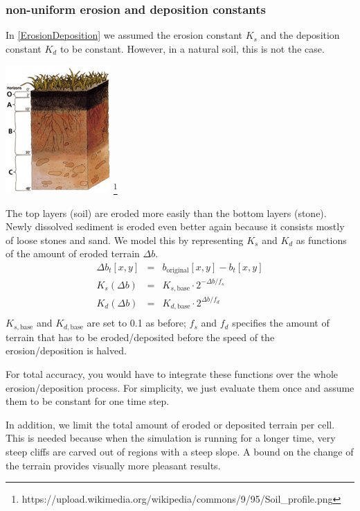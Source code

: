 \documentclass[journal, letterpaper]{IEEEtran}
\begin{document}
\subsubsection{non-uniform erosion and deposition constants}
In \ref{ErosionDeposition} we assumed the erosion constant $K_s$ and the deposition constant $K_d$ to be constant.
However, in a natural soil, this is not the case.
\begin{center}
	\includegraphics[width=0.3\textwidth]{images/Soil_profile}
	\footnote{https://upload.wikimedia.org/wikipedia/commons/9/95/Soil\_profile.png}
\end{center}
The top layers (soil) are eroded more easily than the bottom layers (stone). Newly dissolved sediment is eroded even better again because it consists mostly of loose stones and sand.
We model this by representing $K_s$ and $K_d$ as functions of the amount of eroded terrain $\Delta b$.
\begin{equation}
\begin{array}{rcl}
	\Delta b_t[x,y] &=& b_\text{original}[x,y] - b_t[x,y] \\
	K_s(\Delta b) &=& K_{s,\text{base}} \cdot 2^{-\Delta b / f_s} \\
	K_d(\Delta b) &=& K_{d,\text{base}} \cdot 2^{\Delta b / f_d} \\
\end{array}
\label{eq:KsKd}
\end{equation}
$K_{s,\text{base}}$ and $K_{d,\text{base}}$ are set to 0.1 as before; $f_s$ and $f_d$ specifies the amount of terrain that has to be eroded/deposited before the speed of the erosion/deposition is halved.

For total accuracy, you would have to integrate these functions over the whole erosion/deposition process. For simplicity, we just evaluate them once and assume them to be constant for one time step.

In addition, we limit the total amount of eroded or deposited terrain per cell. This is needed because when the simulation is running for a longer time, very steep cliffs are carved out of regions with a steep slope. A bound on the change of the terrain provides visually more pleasant results.
\end{document}
